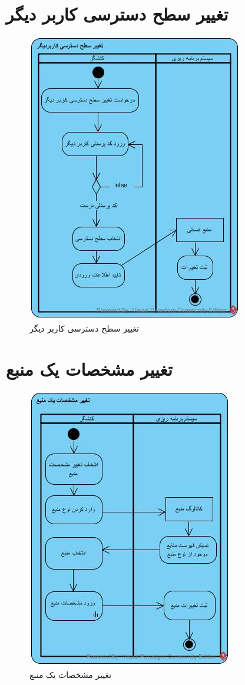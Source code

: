 \section{تغییر سطح دسترسی کاربر دیگر}
\begin{figure}[H]
	\centering
	\includegraphics[scale=1]{img/activity/ChangeAccessLevel}
	\caption{تغییر سطح دسترسی کاربر دیگر}
\end{figure}


\section{تغییر مشخصات یک منبع}
\begin{figure}[H]
	\centering
	\includegraphics[scale=1]{img/activity/EditResourceAttributes}
	\caption{تغییر مشخصات یک منبع}
\end{figure}



